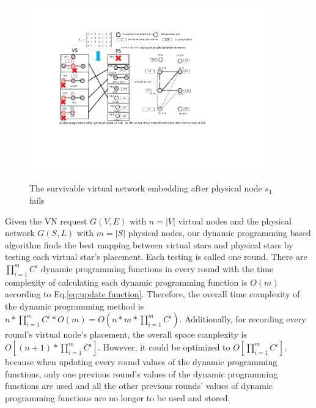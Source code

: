 

\begin{figure}
\centering
\includegraphics[width=4in]{Fig/Node1Failure}\\
  \caption{The survivable virtual network embedding after physical node $s_1$ fails}\label{fig:Node1Failure}
\end{figure}










Given the VN request $G (V,E)$ with $n = \left| V \right|$ virtual nodes and the physical network  $G (S,L)$ with $m = \left| S \right|$ physical nodes,  our dynamic programming based algorithm finds the best mapping between virtual stars and physical stars by testing each virtual star's placement. Each testing is called one round. There are $\prod_{i=1}^{m}C^i$ dynamic programming functions in every round with the time complexity of calculating each dynamic programming function is $O(m)$ according to Eq.\ref{eq:update function}. Therefore, the overall time complexity of the dynamic programming method is $n*\prod_{i=1}^{m}C^i*O(m)=O(n*m*\prod_{i=1}^{m}C^i)$. Additionally, for recording every round's virtual node's placement, the overall space complexity is $O[(n+1)*\prod_{i=1}^{m}C^i]$. However, it could be optimized to $O[\prod_{i=1}^{m}C^i]$, because when updating every round values of the dynamic programming functions, only one previous round's  values of the dynamic programming functions are used and  all the other previous rounds' values of  dynamic programming functions  are no longer to be used and stored.





